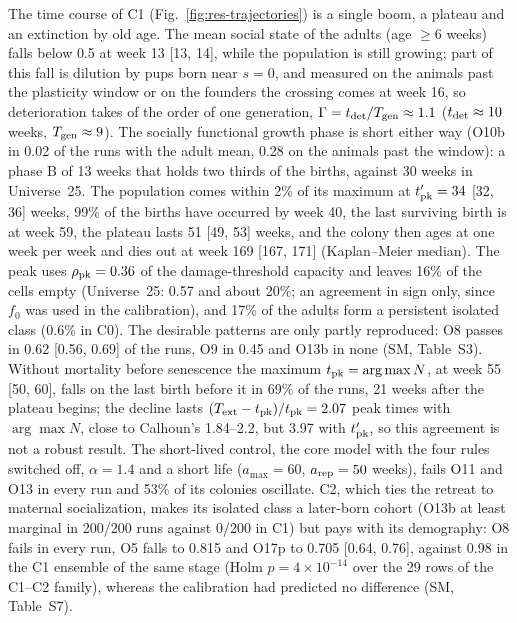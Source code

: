 The time course of \textsf{C1} (Fig.~\ref{fig:res-trajectories}) is a single boom, a plateau and an extinction
by old age. The mean social state of the adults (age $\ge6$ weeks) falls below 0.5 at week 13 [13, 14], while the
population is still growing; part of this fall is dilution by pups born near $s=0$, and measured on the animals
past the plasticity window or on the founders the crossing comes at week 16, so deterioration takes of the order of
one generation, $\Gamma=t_{\rm det}/T_{\rm gen}\approx1.1$ ($t_{\rm det}\approx10$ weeks, $T_{\rm gen}\approx9$).
The socially functional growth phase is short either way (O10b in 0.02 of the runs with the adult mean, 0.28 on the
animals past the window): a phase B of 13 weeks that holds two thirds of the births, against 30 weeks in
Universe~25. The population comes within 2\% of its maximum at $t'_{\rm pk}=34$ [32, 36] weeks, 99\% of the births
have occurred by week 40, the last surviving birth is at week 59, the plateau lasts 51 [49, 53] weeks, and the
colony then ages at one week per week and dies out at week 169 [167, 171] (Kaplan--Meier median). The peak uses
$\rho_{\rm pk}=0.36$ of the damage-threshold capacity and leaves 16\% of the cells empty (Universe~25: 0.57 and
about 20\%; an agreement in sign only, since $f_0$ was used in the calibration), and 17\% of the adults form a
persistent isolated class (0.6\% in \textsf{C0}). The desirable patterns are only partly reproduced: O8 passes in
0.62 [0.56, 0.69] of the runs, O9 in 0.45 and O13b in none (SM, Table~S3). Without mortality before senescence the
maximum $t_{\rm pk}=\arg\max N$, at week 55 [50, 60], falls on the last birth before it in 69\% of the runs, 21
weeks after the plateau begins; the decline lasts $(T_{\rm ext}-t_{\rm pk})/t_{\rm pk}=2.07$ peak times with
$\arg\max N$, close to Calhoun's 1.84--2.2, but 3.97 with $t'_{\rm pk}$, so this agreement is not a robust result.
The short-lived control, the core model with the four rules switched off, $\alpha=1.4$ and a short life
($a_{\max}=60$, $a_{\rm rep}=50$ weeks), fails O11 and O13 in every run and 53\% of its colonies oscillate. \textsf{C2}, which
ties the retreat to maternal socialization, makes its isolated class a later-born cohort (O13b at least marginal in
200/200 runs against 0/200 in \textsf{C1}) but pays with its demography: O8 fails in every run, O5 falls to 0.815
and O17p to 0.705 [0.64, 0.76], against 0.98 in the \textsf{C1} ensemble of the same stage (Holm
$p=4\times10^{-14}$ over the 29 rows of the \textsf{C1}--\textsf{C2} family), whereas the calibration had predicted
no difference (SM, Table~S7).


